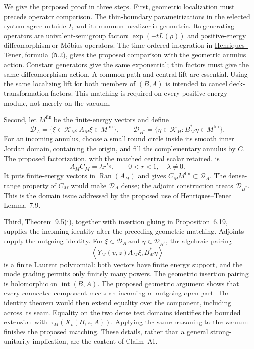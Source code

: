 We give the proposed proof in three steps.  First, geometric localization
must precede operator comparison.  The thin-boundary parametrizations in
the selected system agree outside $I$, and its common localizer is
geometric.  Its generating operators are univalent-semigroup factors
$\exp(-tL(\rho))$ and positive-energy diffeomorphism or M\"obius
operators.  The time-ordered integration in
\href{https://arxiv.org/html/2506.08684#S5}
{Henriques--Tener, formula~(5.2)}, gives the proposed comparison with the
geometric annulus action.  Constant generators give the same exponential;
thin factors must give the same diffeomorphism action.  A common path
and central lift are essential.  Using the same localizing lift for both
members of $(B,A)$ is intended to cancel deck-transformation factors.
This matching is required on every positive-energy module, not merely
on the vacuum.

Second, let $M^{\mathrm{fin}}$ be the finite-energy vectors and define
\begin{equation}
 \mathcal D_A=\{\xi\in\mathcal K_M:A_M\xi\in M^{\mathrm{fin}}\},
 \qquad
 \mathcal D_{B^*}=\{\eta\in\mathcal K_M:B_M^*\eta\in M^{\mathrm{fin}}\}.
 \label{eq:analytic-annulus-domains}
\end{equation}
For an incoming annulus, choose a small round circle inside its smooth
inner Jordan domain, containing the origin, and fill the complementary
annulus by $C$.  The proposed factorization, with the matched central
scalar retained, is
\begin{equation}
 A_MC_M=\lambda r^{L_0},\qquad 0<r<1,\quad\lambda\ne0.
 \label{eq:analytic-round-factorization}
\end{equation}
It puts finite-energy vectors in $\operatorname{Ran}(A_M)$ and gives
$C_M M^{\mathrm{fin}}\subset\mathcal D_A$.  The dense-range property of
$C_M$ would make $\mathcal D_A$ dense; the adjoint construction treats
$\mathcal D_{B^*}$.  This is the domain issue addressed by the proposed
use of Henriques--Tener Lemma~7.9.

Third, Theorem~9.5(i), together with insertion gluing in
Proposition~6.19, supplies the incoming identity after the preceding
geometric matching.  Adjoints supply the outgoing identity.  For
$\xi\in\mathcal D_A$ and $\eta\in\mathcal D_{B^*}$, the algebraic pairing
\begin{equation}
 \left\langle Y_M(v,z)A_M\xi,B_M^*\eta\right\rangle
 \label{eq:analytic-laurent-pairing}
\end{equation}
is a finite Laurent polynomial: both vectors have finite energy support,
and the mode grading permits only finitely many powers.  The geometric
insertion pairing is holomorphic on $\operatorname{int}(B,A)$.
The proposed geometric argument shows that every connected component
meets an incoming or outgoing open part.  The identity theorem would
then extend equality over the component, including across its seam.
Equality on the two dense test domains identifies the bounded extension
with $\pi_M(X_v(B,z,A))$.  Applying the same reasoning to the vacuum
finishes the proposed matching.  These details, rather than a general
strong-unitarity implication, are the content of Claim~A1.

